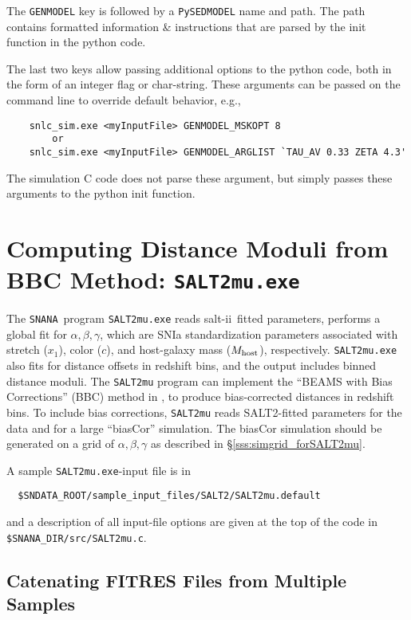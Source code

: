 \documentclass[12pt]{article}
\newcommand{\SALTII}{{\sc salt-ii}}
\newcommand{\snana}{{\tt SNANA}}
\newcommand{\hostmass}{M_{\rm host}}
\begin{document}
The {\tt GENMODEL} key is followed by a {\tt PySEDMODEL} name
and path. The path contains formatted information \& instructions 
that are parsed by the init function in the python code.

The last two keys allow passing additional options to the
python code, both in the form of an integer flag or char-string.
These arguments can be passed on the command line to override
default behavior, e.g.,
%
\begin{verbatim}
    snlc_sim.exe <myInputFile> GENMODEL_MSKOPT 8
        or
    snlc_sim.exe <myInputFile> GENMODEL_ARGLIST `TAU_AV 0.33 ZETA 4.3'
\end{verbatim}
The simulation C code does not parse these argument, but simply
passes these arguments to the python init function.


   \clearpage
   \section{Computing Distance Moduli from BBC Method: {\tt SALT2mu.exe} }
   \label{sec:SALT2mu}


The \snana\ program {\tt SALT2mu.exe} reads \SALTII\ fitted parameters,
performs a global fit for $\alpha,\beta,\gamma$, which are SNIa 
standardization parameters associated with 
stretch ($x_1$), color ($c$), and host-galaxy mass ($\hostmass$),
respectively.
{\tt SALT2mu.exe} also fits for distance offsets in redshift bins,
and the output includes binned distance moduli.
The {\tt SALT2mu} program can implement the 
``BEAMS with Bias Corrections'' (BBC) method in \cite{JM11,BBC},
to produce bias-corrected distances in redshift bins.
To include bias corrections, {\tt SALT2mu} reads SALT2-fitted 
parameters for the data and for a large ``biasCor'' simulation.
The biasCor simulation should be generated on a grid of
$\alpha,\beta,\gamma$ as described in \S\ref{sss:simgrid_forSALT2mu}.

A sample {\tt SALT2mu.exe}-input file is in
\begin{verbatim}
  $SNDATA_ROOT/sample_input_files/SALT2/SALT2mu.default
\end{verbatim}
and a description of all input-file options are given at the
top of the code in {\tt \$SNANA\_DIR/src/SALT2mu.c}.


  \clearpage
  \subsection{Catenating FITRES Files from Multiple Samples}
  \label{subsec:cat_fitres}
\end{document}
